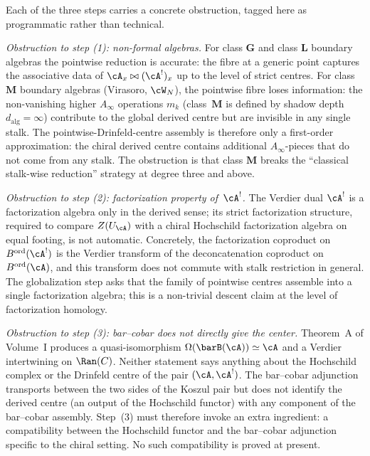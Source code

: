 \begin{remark}
\label{rem:drinfeld-center-obstructions}
Each of the three steps carries a concrete obstruction, tagged here as
programmatic rather than technical.

\emph{Obstruction to step (1): non-formal algebras.}
For class $\mathbf{G}$ and class $\mathbf{L}$ boundary algebras the
pointwise reduction is accurate: the fibre at a generic point captures
the associative data of $\cA_x \bowtie (\cA^!)_x$ up to the level of
strict centres. For class $\mathbf{M}$ boundary algebras (Virasoro,
$\cW_N$), the pointwise fibre loses information: the non-vanishing
higher $A_\infty$ operations $m_k$ (class~$\mathbf{M}$ is defined by
shadow depth $d_{\mathrm{alg}} = \infty$) contribute to the global
derived centre but are invisible in any single stalk. The
pointwise-Drinfeld-centre assembly is therefore only a first-order
approximation: the chiral derived centre contains additional
$A_\infty$-pieces that do not come from any stalk. The obstruction is
that class $\mathbf{M}$ breaks the ``classical stalk-wise reduction''
strategy at degree three and above.

\emph{Obstruction to step (2): factorization property of~$\cA^!$.}
The Verdier dual $\cA^!$ is a factorization algebra only in the derived
sense; its strict factorization structure, required to compare
$Z(U_\cA)$ with a chiral Hochschild factorization algebra on equal
footing, is not automatic. Concretely, the factorization coproduct on
$B^{\mathrm{ord}}(\cA^!)$ is the Verdier transform of the deconcatenation
coproduct on $B^{\mathrm{ord}}(\cA)$, and this transform does not commute with stalk restriction
in general. The globalization step asks that the family of pointwise
centres assemble into a single factorization algebra; this is a
non-trivial descent claim at the level of factorization homology.

\emph{Obstruction to step (3): bar--cobar does not directly give the
center.}
Theorem~A of Volume~I produces a quasi-isomorphism
$\Omega(\barB(\cA)) \simeq \cA$ and a Verdier intertwining on
$\Ran(C)$. Neither statement says anything about the Hochschild complex
or the Drinfeld centre of the pair $(\cA, \cA^!)$. The bar--cobar
adjunction transports between the two sides of the Koszul pair but does
not identify the derived centre (an output of the Hochschild functor) with any component of the bar--cobar assembly. Step~(3) must
therefore invoke an extra ingredient: a compatibility between the
Hochschild functor and the bar--cobar adjunction specific to the chiral
setting. No such compatibility is proved at present.
\end{remark}

